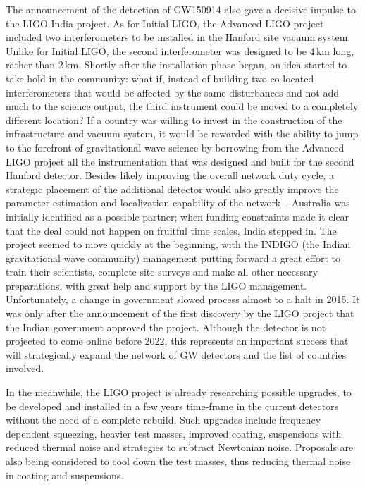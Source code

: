 The announcement of the detection of GW150914 also gave a decisive impulse to the LIGO India project.
As for Initial LIGO, the Advanced LIGO project included two interferometers to be installed in the Hanford site vacuum system.
Unlike for Initial LIGO, the second interferometer was designed to be 4\,km long, rather than 2\,km. 
Shortly after the installation phase began, an idea started to take hold in the community: what if, instead of building two co-located interferometers that would be affected by the same disturbances and not add much to the science output, the third instrument could be moved to a completely different location? 
If a country was willing to invest in the construction of the infrastructure and vacuum system, it would be rewarded with the ability to jump to the forefront of gravitational wave science by borrowing from the Advanced LIGO project all the instrumentation that was designed and built for the second Hanford detector. 
Besides likely improving the overall network duty cycle, a strategic placement of the additional detector would also greatly improve the parameter estimation and localization capability of the network~\cite{Klimenko_2016}.
Australia was initially identified as a possible partner; when funding constraints made it clear that the deal could not happen on fruitful time scales, India stepped in.
The project seemed to move quickly at the beginning, with the INDIGO (the Indian gravitational wave community) management putting forward a great effort to train their scientists, complete site surveys and make all other necessary preparations, with great help and support by the LIGO management. 
Unfortunately, a change in government slowed process almost to a halt in 2015. 
It was only after the announcement of the first discovery by the LIGO project that the Indian government approved the project. 
Although the detector is not projected to come online before 2022, this represents an important success that will strategically expand the network of GW detectors and the list of countries involved.

In the meanwhile, the LIGO project is already researching possible upgrades, to be developed and installed in a few years time-frame in the current detectors without the need of a complete rebuild.
Such upgrades include frequency dependent squeezing, heavier test masses, improved coating, suspensions with reduced thermal noise and strategies to subtract Newtonian noise.
Proposals are also being considered to cool down the test masses, thus reducing thermal noise in coating and suspensions. 

